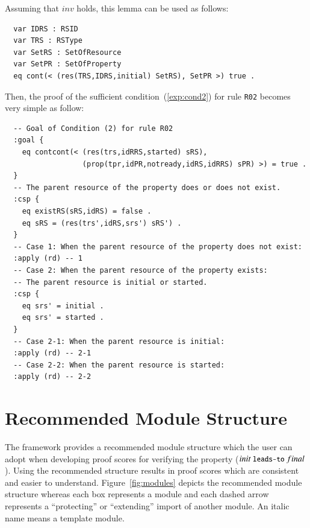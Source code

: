 \documentclass[12pt]{report}
\newcommand{\mbstt}[1]{\mbox{\small{\tt {#1}}}}
\begin{document}
Assuming that $inv$ holds, this lemma can be used as follows:
\small
\begin{verbatim}
  var IDRS : RSID 
  var TRS : RSType
  var SetRS : SetOfResource
  var SetPR : SetOfProperty
  eq cont(< (res(TRS,IDRS,initial) SetRS), SetPR >) true .
\end{verbatim}
\normalsize
Then, the proof of the sufficient condition~(\ref{exp:cond2}) for rule
{\tt R02} becomes very simple as follow:
\small
\begin{verbatim}
  -- Goal of Condition (2) for rule R02
  :goal {
    eq contcont(< (res(trs,idRRS,started) sRS),
                  (prop(tpr,idPR,notready,idRS,idRRS) sPR) >) = true .
  }
  -- The parent resource of the property does or does not exist.
  :csp {
    eq existRS(sRS,idRS) = false .
    eq sRS = (res(trs',idRS,srs') sRS') .
  }
  -- Case 1: When the parent resource of the property does not exist:
  :apply (rd) -- 1
  -- Case 2: When the parent resource of the property exists:
  -- The parent resource is initial or started.
  :csp {
    eq srs' = initial .
    eq srs' = started .
  }
  -- Case 2-1: When the parent resource is initial:
  :apply (rd) -- 2-1
  -- Case 2-2: When the parent resource is started:
  :apply (rd) -- 2-2
\end{verbatim}
\normalsize

\section{Recommended Module Structure}
The framework provides a recommended module structure which the user
can adopt when developing proof scores for verifying the property
($init~\mbstt{leads-to}~final$). Using the recommended structure
results in proof scores which are consistent and easier to understand.
Figure~\ref{fig:modules} depicts the recommended module structure
whereas each box represents a module and each dashed arrow represents
a ``protecting'' or ``extending'' import of another module. An italic
name means a template module.
\end{document}
